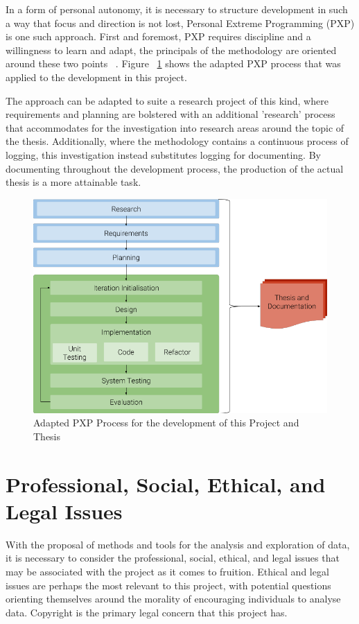 \documentclass[10pt]{report}
\begin{document}
In a form of personal autonomy, it is necessary to structure development in such a way that focus and direction is not lost, Personal Extreme Programming (PXP) is one such approach. First and foremost, PXP requires discipline and a willingness to learn and adapt, the principals of the methodology are oriented around these two points ~\cite{Dzhurov2009-sr}. Figure ~\ref{fig:pxp_process} shows the adapted PXP process that was applied to the development in this project. 

The approach can be adapted to suite a research project of this kind, where requirements and planning are bolstered with an additional 'research' process that accommodates for the investigation into research areas around the topic of the thesis. Additionally, where the methodology contains a continuous process of logging, this investigation instead substitutes logging for documenting. By documenting throughout the development process, the production of the actual thesis is a more attainable task.

\begin{figure}[h!]
  \centering
  \includegraphics[scale=0.5]{pxp_process}
  \caption{Adapted PXP Process for the development of this Project and Thesis\label{fig:pxp_process}}
\end{figure}

\section{Professional, Social, Ethical, and Legal Issues}

With the proposal of methods and tools for the analysis and exploration of data, it is necessary to consider the professional, social, ethical, and legal issues that may be associated with the project as it comes to fruition. Ethical and legal issues are perhaps the most relevant to this project, with potential questions orienting themselves around the morality of encouraging individuals to analyse data. Copyright is the primary legal concern that this project has.
\end{document}
